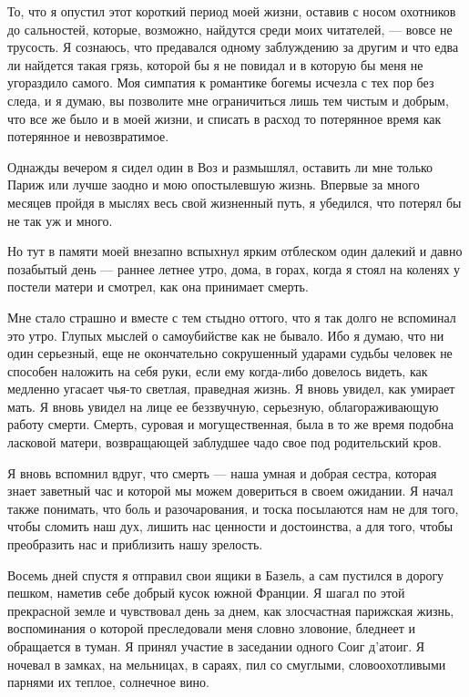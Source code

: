 То, что  я опустил этот  короткий период  моей жизни, оставив  с носом
охотников  до  сальностей,  которые,  возможно,  найдутся  среди  моих
читателей, ---  вовсе не трусость.  Я сознаюсь, что  предавался одному
заблуждению за другим и что едва ли найдется такая грязь, которой бы я
не повидал  и в которую бы  меня не угораздило самого.  Моя симпатия к
романтике богемы исчезла с тех пор  без следа, и я думаю, вы позволите
мне ограничиться лишь  тем чистым и добрым,  что все же было  и в моей
жизни,  и  списать в  расход  то  потерянное  время как  потерянное  и
невозвратимое.

Однажды вечером я сидел один в Воз и размышлял, оставить ли мне только
Париж  или лучше  заодно и  мою опостылевшую  жизнь. Впервые  за много
месяцев  пройдя в  мыслях весь  свой жизненный  путь, я  убедился, что
потерял бы не так уж и много.

Но тут в памяти моей внезапно  вспыхнул ярким отблеском один далекий и
давно позабытый  день --- раннее летнее  утро, дома, в горах,  когда я
стоял на коленях у постели матери и смотрел, как она принимает смерть.

Мне стало  страшно и вместе  с тем стыдно оттого,  что я так  долго не
вспоминал это утро. Глупых мыслей о  самоубийстве как не бывало. Ибо я
думаю, что ни один серьезный,  еще не окончательно сокрушенный ударами
судьбы человек не способен наложить  на себя руки, если ему когда-либо
довелось видеть, как медленно угасает чья-то светлая, праведная жизнь.
Я  вновь  увидел,  как  умирает  мать.  Я  вновь  увидел  на  лице  ее
беззвучную, серьезную, облагораживающую работу смерти. Смерть, суровая
и  могущественная,  была  в  то  же  время  подобна  ласковой  матери,
возвращающей заблудшее чадо свое под родительский кров.

Я вновь  вспомнил вдруг, что  смерть ---  наша умная и  добрая сестра,
которая  знает заветный  час и  которой  мы можем  довериться в  своем
ожидании. Я  начал также понимать,  что боль и разочарования,  и тоска
посылаются нам не для того, чтобы сломить наш дух, лишить нас ценности
и достоинства,  а для  того, чтобы преобразить  нас и  приблизить нашу
зрелость.

Восемь дней  спустя я отправил свои  ящики в Базель, а  сам пустился в
дорогу пешком,  наметив себе  добрый кусок южной  Франции. Я  шагал по
этой  прекрасной земле  и  чувствовал день  за  днем, как  злосчастная
парижская  жизнь,  воспоминания  о которой  преследовали  меня  словно
зловоние, бледнеет и обращается в  туман. Я принял участие в заседании
одного Соиг д'атоиг.  Я ночевал в замках, на мельницах,  в сараях, пил
со смуглыми, словоохотливыми парнями их теплое, солнечное вино.

